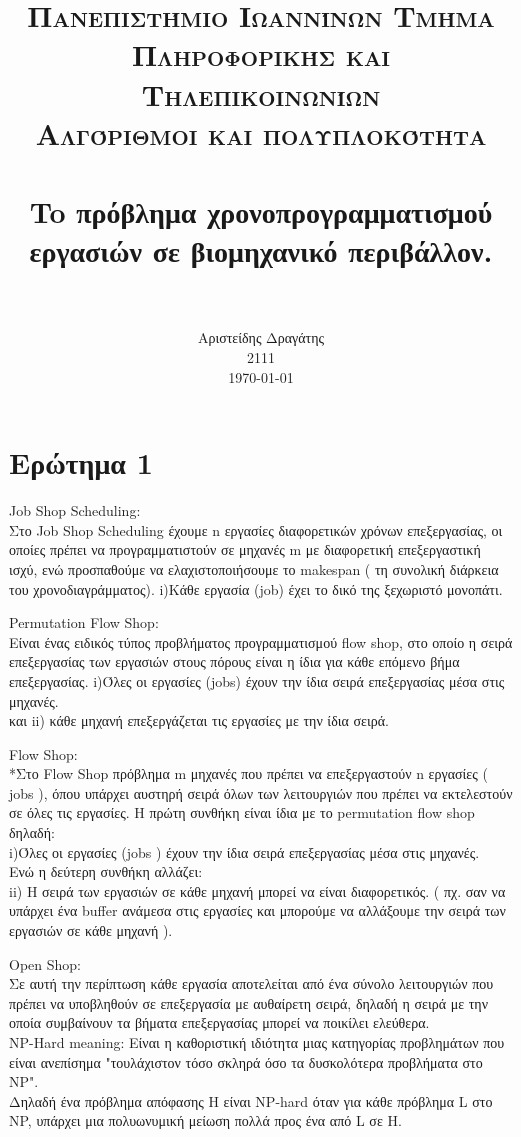 \documentclass[paper=a4, fontsize=11pt]{scrartcl}
\title{
		\usefont{OT1}{bch}{b}{n}
		\normalfont \normalsize \textsc{Πανεπιστήμιο Ιωαννίνων Τμήμα Πληροφορικής και Τηλεπικοινωνίων} \\ [1em]
		\normalfont \normalsize \textsc{Αλγόριθμοι και πολυπλοκότητα} \\ [1em]
		\horrule{0.5pt} \\[0.4cm]
		\huge To πρόβλημα χρονοπρογραμματισμού εργασιών σε βιομηχανικό περιβάλλον. \\
		\horrule{2pt} \\[0.5cm]
}
\author{
		\normalfont 								\normalsize
        Αριστείδης Δραγάτης\\[-1pt]		\normalsize
	    2111 \\[-1pt]   \normalsize
        \today
}
\date{}
\numberwithin{equation}{section}		%
\numberwithin{figure}{section}			%
\numberwithin{table}{section}				%
\begin{document}
\maketitle

\section*{Ερώτημα 1}
Job Shop Scheduling: \\
Στο Job Shop Scheduling έχουμε n εργασίες διαφορετικών χρόνων επεξεργασίας, οι οποίες πρέπει να προγραμματιστούν σε μηχανές m με διαφορετική επεξεργαστική ισχύ, ενώ προσπαθούμε να ελαχιστοποιήσουμε το makespan ( τη συνολική διάρκεια του χρονοδιαγράμματος).
i)Κάθε εργασία (job) έχει το δικό της ξεχωριστό μονοπάτι. 

Permutation Flow Shop: \\ 
Είναι ένας ειδικός τύπος προβλήματος προγραμματισμού flow shop, στο οποίο η σειρά επεξεργασίας των εργασιών στους πόρους είναι η ίδια για κάθε επόμενο βήμα επεξεργασίας.
i)Όλες οι εργασίες (jobs) έχουν την ίδια σειρά επεξεργασίας μέσα στις μηχανές. \\
και ii) κάθε μηχανή επεξεργάζεται τις εργασίες με την ίδια σειρά.

Flow Shop:\\
*Στο Flow Shop πρόβλημα m μηχανές που πρέπει να επεξεργαστούν n εργασίες ( jobs ), 
όπου υπάρχει αυστηρή σειρά όλων των λειτουργιών που πρέπει να εκτελεστούν σε όλες τις εργασίες.
Η πρώτη συνθήκη είναι ίδια με το permutation flow shop δηλαδή: \\
i)Όλες οι εργασίες (jobs ) έχουν την ίδια σειρά επεξεργασίας μέσα στις μηχανές. \\
Ενώ η δεύτερη συνθήκη αλλάζει: \\
ii) Η σειρά των εργασιών σε κάθε μηχανή μπορεί να είναι διαφορετικός. ( πχ. σαν να υπάρχει ένα buffer ανάμεσα στις εργασίες και μπορούμε να αλλάξουμε την σειρά των εργασιών σε κάθε μηχανή ).


Open Shop: \\
Σε αυτή την περίπτωση κάθε εργασία αποτελείται από ένα σύνολο λειτουργιών που πρέπει να υποβληθούν σε επεξεργασία με αυθαίρετη σειρά, δηλαδή η σειρά με την οποία συμβαίνουν τα βήματα επεξεργασίας μπορεί να ποικίλει ελεύθερα. \\ 

NP-Hard meaning:
Είναι η καθοριστική ιδιότητα μιας κατηγορίας προβλημάτων που είναι ανεπίσημα "τουλάχιστον τόσο σκληρά όσο τα δυσκολότερα προβλήματα στο NP". \\ 
Δηλαδή ένα πρόβλημα απόφασης H είναι NP-hard όταν για κάθε πρόβλημα L στο NP, υπάρχει μια πολυωνυμική μείωση πολλά προς ένα από L σε H.  	
\end{document}
